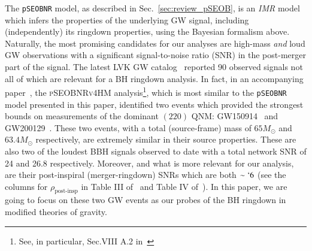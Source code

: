 \documentclass[twocolumn,
               prd,
               aps,
               superscriptaddress,
               tightenlines,
               nofootinbib,
               eqsecnum,
               amsfonts,
               amsmath,
               longbibliography]{revtex4-1}
\newcommand{\Mo}{M_{\odot}}
\newcommand{\pSEOB}{\texttt{pSEOBNR}}
\begin{document}
The \pSEOB{} model, as described in Sec.~\ref{sec:review_pSEOB}, is an
\emph{IMR} model which infers the properties of the underlying GW signal,
including (independently) its ringdown properties, using the Bayesian formalism
above. Naturally, the most promising candidates for our analyses are high-mass
\emph{and} loud GW observations with a significant signal-to-noise ratio (SNR)
in the post-merger part of the signal.
%
The latest LVK GW catalog~\cite{LIGOScientific:2021djp} reported 90 observed
signals not all of which are relevant for a BH ringdown analysis. In fact, in
an accompanying paper~\cite{LIGOScientific:2021sio}, the \textsc{pSEOBNRv4HM}
analysis\footnote{See, in particular, Sec.VIII A.2
in~\cite{LIGOScientific:2021sio}}, which is most similar to the \pSEOB{} model
presented in this paper, identified two events which provided the strongest
bounds on measurements of the dominant $(220)$ QNM:
GW150914~\cite{LIGOScientific:2016aoc} and
GW200129~\cite{LIGOScientific:2021djp}.
%
These two events, with a total (source-frame) mass of $65 \Mo$ and $63.4 \Mo$ respectively, are
extremely similar in their source properties. These are also two of the loudest
BBH signals observed to date with a total network SNR of 24 and 26.8
respectively.
%
Moreover, and what is more relevant for our analysis, are their post-inspiral
(merger-ringdown) SNRs which are both $\sim `6$ (see the columns for
$\rho_{\text{post-insp}}$ in Table III of~\cite{LIGOScientific:2019fpa} and
Table IV of~\cite{LIGOScientific:2021sio}).
%
In this paper, we are going to focus on these two GW events as our probes of
the BH ringdown in modified theories of gravity.
\end{document}

